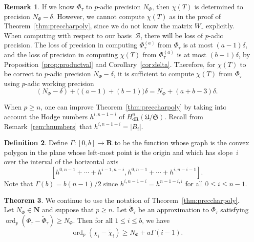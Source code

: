 \documentclass[a4paper,11pt]{article}
\numberwithin{equation}{section}
\providecommand{\card}[1]{\lvert#1\rvert}                %
\newcommand{\NN}{\mathbf{N}} %
\newcommand{\RR}{\mathbf{R}} %
\DeclareMathOperator{\ord}{ord}          %
\providecommand{\HdR}{H_{\text{dR}}}    %
\providecommand{\cB}{\mathcal{B}} %
\theoremstyle{definition}
\newtheorem{thm}{Theorem}[section]
\newtheorem{defn}[thm]{Definition}
\newtheorem{rem}[thm]{Remark}
\begin{document}
\begin{rem} \label{rem:workprecchi}
If we know $\Phi_{\tau}$ to $p$-adic precision $N_{\Phi}$, then
$\chi(T)$ is determined to precision $N_{\Phi}-\delta$.
However, we cannot compute $\chi(T)$ as in the proof of 
Theorem~\ref{thm:preccharpoly}, since we do not know the matrix 
$W_{\tau}$ explicitly. When computing with respect to our basis~$\cB$,
there will be loss of $p$-adic precision. The loss of precision 
in computing $\Phi_{\tau}^{(a)}$ from $\Phi_{\tau}$ is at most 
$(a-1)\delta$, and the loss of 
precision in computing $\chi(T)$ from $\Phi_{\tau}^{(a)}$ 
is at most $(b-1) \delta$, by Proposition~\ref{prop:productval} and 
Corollary~\ref{cor:delta}. Therefore, for $\chi(T)$ to be correct
to $p$-adic precision $N_{\Phi}-\delta$, it is sufficient to compute 
$\chi(T)$ from $\Phi_{\tau}$ using $p$-adic working precision 
\[
(N_{\Phi}-\delta)+\bigl((a-1)+(b-1)\bigr)\delta = N_{\Phi}+(a+b-3)\delta.
\] 
\end{rem}

When $p \geq n$, one can improve Theorem~\ref{thm:preccharpoly} by taking into 
account the Hodge numbers $h^{i,n-1-i}$ of $\HdR^{n}(\mathfrak{U}/\mathfrak{S})$.
Recall from Remark~\ref{rem:hnumbers} that $h^{i,n-1-i}=\card{B_i}$.

\begin{defn}
Define $\Gamma \colon [0,b] \rightarrow \RR$ to be the function whose graph 
is the convex polygon in the plane whose left-most point is the origin and 
which has slope~$i$ over the interval of the horizontal axis 
\[
[h^{0,n-1} + \dotsb + h^{i-1,n-i}, h^{0,n-1} + \dotsb + h^{i,n-i-1}].
\]
Note that $\Gamma(b)=b(n-1)/2$ since $h^{i,n-1-i}=h^{n-1-i,i}$ for all $0 \leq i \leq n-1$.
\end{defn}

\begin{thm} \label{thm:pgeqn}
We continue to use the notation of Theorem~\ref{thm:preccharpoly}. 
Let $N_{\Phi} \in \NN$ and suppose that $p \geq n$. Let $\tilde{\Phi}_{\tau}$ 
be an approximation to $\Phi_{\tau}$ satisfying $\ord_p (\Phi_{\tau}-\tilde{\Phi}_{\tau}) \geq N_{\Phi}$. 
Then for all $1 \leq i \leq b$, we have
\[
\ord_p(\chi_i-\tilde{\chi}_i) \geq N_{\Phi} + a\Gamma(i-1).
\]
\end{thm}
 
\end{document}
